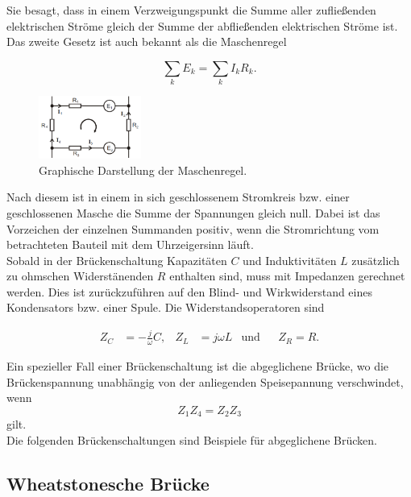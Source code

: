 \noindent Sie besagt, dass in einem Verzweigungspunkt die Summe aller zufließenden elektrischen Ströme gleich der Summe der abfließenden elektrischen Ströme ist. 
Das zweite Gesetz ist auch bekannt als die Maschenregel

\begin{equation}
    \sum_k E_k = \sum_k I_k R_k.
    \label{eqn:masche}
\end{equation}

\begin{figure}[H]
    \centering
    \includegraphics[width=0.3\textwidth]{build/maschen.PNG}
    \caption{Graphische Darstellung der Maschenregel.\cite[217]{V302}}
    \label{fig:maschen}
\end{figure}

\noindent Nach diesem ist in einem in sich geschlossenem Stromkreis bzw. einer geschlossenen Masche die Summe der Spannungen gleich null. 
Dabei ist das Vorzeichen der einzelnen Summanden positiv, wenn die Stromrichtung vom betrachteten Bauteil mit dem Uhrzeigersinn läuft.\\
Sobald in der Brückenschaltung Kapazitäten $C$ und Induktivitäten $L$ zusätzlich zu ohmschen Widerstänenden $R$ enthalten sind, muss mit Impedanzen gerechnet werden.
Dies ist zurückzuführen auf den Blind- und Wirkwiderstand eines Kondensators bzw. einer Spule.
Die Widerstandsoperatoren sind 

\begin{align}
    Z_C &= -\frac{j}{\omega} C , & Z_L &= j\omega L  &\text{und}& &Z_R = R .
    \label{eqn:operatoren}
\end{align}

Ein spezieller Fall einer Brückenschaltung ist die abgeglichene Brücke, wo die Brückenspannung unabhängig von der anliegenden Speisepannung verschwindet, wenn 
\begin{equation}
    Z_1 Z_4 = Z_2 Z_3
    \label{eqn:abgleichbed}
\end{equation}
gilt.\\
Die folgenden Brückenschaltungen sind Beispiele für abgeglichene Brücken.

\subsection{Wheatstonesche Brücke}
\label{subsec:wheatstone}

